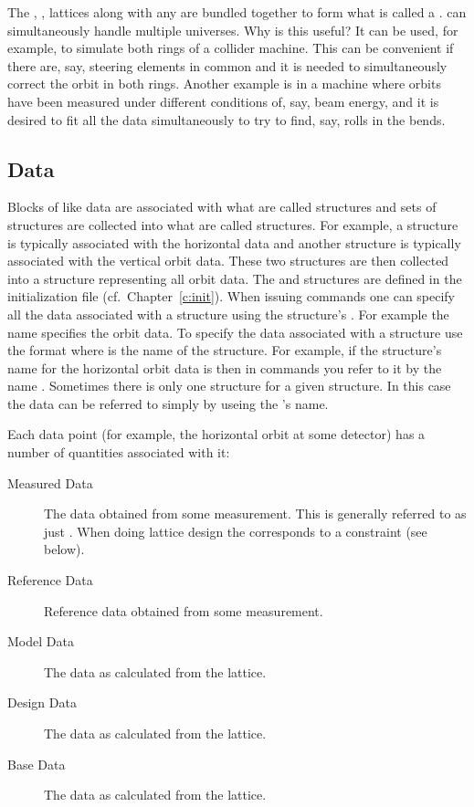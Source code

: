 The , ,  lattices along with any
 are bundled together to form what is called a
. \tao can simultaneously handle multiple universes. Why
is this useful? It can be used, for example, to simulate both rings of
a collider machine. This can be convenient if there are, say, steering
elements in common and it is needed to simultaneously correct the
orbit in both rings. Another example is in a machine where orbits have
been measured under different conditions of, say, beam energy, and it
is desired to fit all the data simultaneously to try to find, say,
rolls in the bends.

\subsection{Data}

Blocks of like data are associated with what are called 
structures and sets of  structures are collected into what
are called  structures. For example, a 
structure is typically associated with the horizontal data and another
 structure is typically associated with the vertical orbit
data. These two structures are then collected into a 
structure representing all orbit data. The  and
 structures are defined in the \tao initialization file
(cf.~Chapter~\ref{c:init}).  When issuing \tao commands one can
specify all the data associated with a  structure using
the  structure's .  For example the name
 specifies the orbit data. To specify the data associated
with a  structure use the format 
where  is the name of the  structure. For
example, if the  structure's name for the horizontal orbit
data is  then in \tao commands you refer to it by the name
. Sometimes there is only one  structure for a
given  structure. In this case the data can be referred to
simply by useing the 's name.

Each data point (for example, the horizontal orbit at some
detector) has a number of quantities associated with it:
  \begin{description}
  \item[Measured Data] 
The data obtained from some measurement. This is generally referred to
as just . When doing lattice design the  corresponds to
a constraint (see below).
  \item[Reference Data] 
Reference data obtained from some measurement.
  \item[Model Data]
The data as calculated from the  lattice.
  \item[Design Data]
The data as calculated from the  lattice.
  \item[Base Data]
The data as calculated from the  lattice.
  \end{description}

